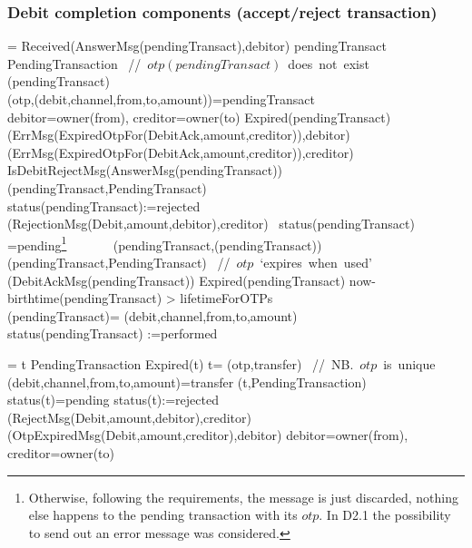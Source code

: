  \subsubsection{Debit completion components (accept/reject transaction)}
 
 
 
\begin{asm}  =\+          
\IF Received(AnswerMsg(pendingTransact),\FROM debitor) \THEN\+
   \IF pendingTransact  \not \in PendingTransaction \mbox{  //  $otp(pendingTransact)$ does not exist}\+
      \THEN ~ (pendingTransact)\\
      \ELSE \+
         \LET (otp,(debit,channel,from,to,amount))=pendingTransact \\
    \LET debitor=owner(from), creditor=owner(to)\+
            \IF Expired(pendingTransact) \THEN \+
     (ErrMsg(ExpiredOtpFor(DebitAck,amount,creditor)),\TO debitor) \\
     (ErrMsg(ExpiredOtpFor(DebitAck,amount,creditor)),\TO creditor)\-
     \ELSE ~\IF  
     IsDebitRejectMsg(AnswerMsg(pendingTransact)) \THEN \+
     (pendingTransact,PendingTransact)\\
     status(pendingTransact):=rejected\\
     (RejectionMsg(Debit,amount,debitor),\TO creditor)\-        
     \ELSE ~\IF status(pendingTransact)   =pending\footnote{Otherwise, following the requirements, the message is just discarded, nothing else happens to the pending transaction with its $otp$. In D2.1 the possibility to send out an error message was considered.}  \+
     \THEN \+
     \+
     ~~~~~~ (pendingTransact,(pendingTransact))\-
     (pendingTransact,PendingTransact)
     \mbox{  // $otp$ `expires when used'}\dec\dec\dec\dec\- 
     (DebitAckMsg(pendingTransact)) \dec\-
     \WHERE \+
     Expired(pendingTransact) \IFF now-birthtime(pendingTransact) > lifetimeForOTPs\\
     (pendingTransact)=\+
     (debit,channel,from,to,amount)\\
     status(pendingTransact) :=performed\\
\end{asm}

 
\begin{asm} 
 =\+          
\IF t \in PendingTransaction \AND Expired(t)  \THEN  \+
          \LET t= (otp,transfer) \mbox{ // NB. $otp$ is unique}\\
          \LET (debit,channel,from,to,amount)=transfer \+
(t,PendingTransaction) \\
          \IF status(t)=pending \THEN \+
          status(t):=rejected\\
(RejectMsg(Debit,amount,debitor),\TO creditor)\\ 
(OtpExpiredMsg(Debit,amount,creditor),\TO debitor)  \dec\dec\dec \-
          \WHERE debitor=owner(from), creditor=owner(to)
\end{asm}
 

